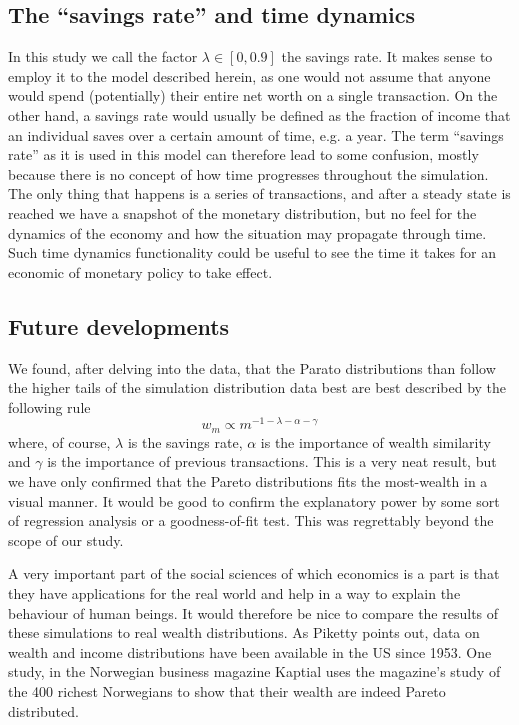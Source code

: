 \documentclass[10pt, a4paper]{amsart}
\begin{document}
\subsection{The ``savings rate'' and time dynamics}
In this study we call the factor $\lambda \in [0,0.9]$ the savings rate. It makes sense to employ it to the model described herein, as one would not assume that anyone would spend (potentially) their entire net worth on a single transaction. On the other hand, a savings rate would usually be defined as the fraction of income that an individual saves over a certain amount of time, e.g. a year. The term ``savings rate'' as it is used in this model can therefore lead to some confusion, mostly because there is no concept of how time progresses throughout the simulation. The only thing that happens is a series of transactions, and after a steady state is reached we have a snapshot of the monetary distribution, but no feel for the dynamics of the economy and how the situation may propagate through time. Such time dynamics functionality could be useful to see the time it takes for an economic of monetary policy to take effect.

\subsection{Future developments}

We found, after delving into the data, that the Parato distributions than follow the higher tails of the simulation distribution data best are best described by the following rule
\begin{equation}
\label{eq:ourpareto}
w_m \propto m^{-1-\lambda-\alpha-\gamma}
\end{equation}
where, of course, $\lambda$ is the savings rate, $\alpha$ is the importance of wealth similarity and $\gamma$ is the importance of previous transactions. This is a very neat result, but we have only confirmed that the Pareto distributions fits the most-wealth in a visual manner. It would be good to confirm the explanatory power by some sort of regression analysis or a goodness-of-fit test. This was regrettably beyond the scope of our study.

A very important part of the social sciences of which economics is a part is that they have applications for the real world and help in a way to explain the behaviour of human beings. It would therefore be nice to compare the results of these simulations to real wealth distributions. As Piketty points out\cite{Piketty}, data on wealth and income distributions have been available in the US since 1953. One study\cite{Kjersti}, in the Norwegian business magazine Kaptial uses the magazine's study of the 400 richest Norwegians to show that their wealth are indeed Pareto distributed. 
\end{document}
